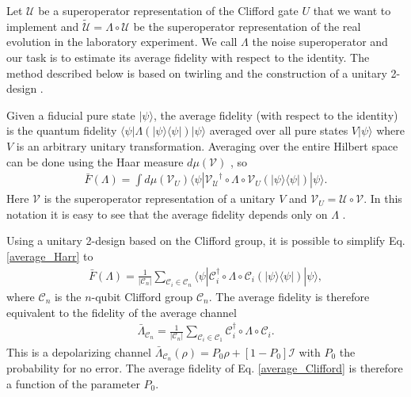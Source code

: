\documentclass[prl,twocolumn,showpacs]{revtex4-1}
\newcommand{\bra}[1]{\langle #1|}
\newcommand{\ket}[1]{|#1\rangle}
\begin{document}
Let  $\mathcal{U}$ be a superoperator representation of  the  Clifford gate $U$ that we want to implement and $\tilde{\mathcal{U}} =\Lambda\circ \mathcal{U}$ be the superoperator representation of the real evolution in the laboratory experiment.  We call $\Lambda$ the noise superoperator and our task is to estimate its  average fidelity with respect to the identity. The method described below is based on twirling \cite{Bennett1996} and the  construction of  a unitary 2-design \cite{Dankert2009}.

Given  a fiducial  pure state  $\ket\psi$, the average fidelity (with respect to the identity) is the quantum fidelity $\bra\psi\Lambda(\ket\psi\bra\psi)\ket\psi$ averaged over all pure states $V\ket\psi$ where $V$ is an arbitrary unitary transformation. Averaging over the entire Hilbert space can be done using the Haar measure   $d\mu(\mathcal{V})$ \cite{Emerson2005},  so
\begin{align} \label{average_Harr}
\bar{F}(\Lambda) = \int d\mu(\mathcal{V}_U) \bra{\psi} \mathcal{V_U}^{\dagger} \circ \Lambda \circ  \mathcal{V}_U(\ket{\psi} \bra{\psi}) \ket{\psi}.
\end{align}
Here $\mathcal{V}$ is the superoperator representation of a unitary $V$ and $\mathcal{V}_U=\mathcal{U}\circ\mathcal{V}$. In this notation it is easy to see that the average fidelity depends only on $\Lambda$ .

Using a unitary 2-design based on the Clifford group, it is possible to simplify Eq. \eqref{average_Harr} to
\begin{align} \label{average_Clifford}
\bar{F}(\Lambda) =  \frac{1}{|\mathcal{C}_n|}\sum_{\mathcal{C}_i\in \mathcal{C}_n}\bra{\psi} \mathcal{C}_i^{\dagger} \circ \Lambda \circ \mathcal{C}_i(\ket{\psi} \bra{\psi}) \ket{\psi},
\end{align}
where $\mathcal{C}_n$  is the $n$-qubit Clifford group $\mathcal{C}_n$.  The average fidelity is therefore equivalent to the fidelity of the average channel
 \begin{align} \label{Cn_twirl}
\bar{\Lambda}_{\mathcal{C}_n} = \frac{1}{|\mathcal{C}_n|}\sum_{\mathcal{C}_i\in \mathcal{C}_1} \mathcal{C}_i^{\dagger} \circ \Lambda \circ \mathcal{C}_i.
\end{align}
This is a depolarizing channel $\bar{\Lambda}_{\mathcal{C}_n}(\rho)=P_0\rho+[1-P_0]\mathcal{I}$ with $P_0$ the  probability for no error. The average fidelity of Eq. \eqref{average_Clifford} is therefore a function of the parameter $P_0$.
\end{document}

